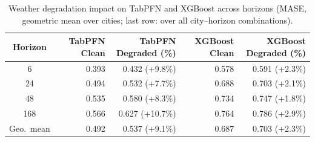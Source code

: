 \begin{table}
\centering
\caption{Weather degradation impact on TabPFN and XGBoost across horizons (MASE, geometric mean over cities; last row: over all city--horizon combinations).}
\label{tab:degradation_tabpfn_xgboost_by_horizon}
\begin{tabular}{crrrr}
\toprule
Horizon & TabPFN Clean & TabPFN Degraded (\%) & XGBoost Clean & XGBoost Degraded (\%) \\
\midrule
6 & 0.393 & 0.432 (+9.8\%) & 0.578 & 0.591 (+2.3\%) \\
24 & 0.494 & 0.532 (+7.7\%) & 0.688 & 0.703 (+2.1\%) \\
48 & 0.535 & 0.580 (+8.3\%) & 0.734 & 0.747 (+1.8\%) \\
168 & 0.566 & 0.627 (+10.7\%) & 0.764 & 0.786 (+2.9\%) \\
\midrule
Geo.\ mean & 0.492 & 0.537 (+9.1\%) & 0.687 & 0.703 (+2.3\%) \\
\bottomrule
\end{tabular}
\end{table}
